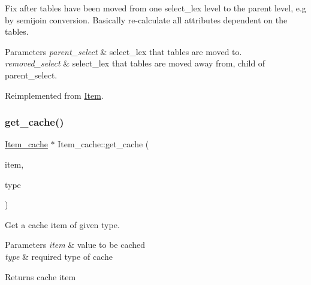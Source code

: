 Fix after tables have been moved from one select\+\_\+lex level to the parent level, e.\+g by semijoin conversion. Basically re-\/calculate all attributes dependent on the tables.


\begin{DoxyParams}{Parameters}
{\em parent\+\_\+select} & select\+\_\+lex that tables are moved to. \\
\hline
{\em removed\+\_\+select} & select\+\_\+lex that tables are moved away from, child of parent\+\_\+select. \\
\hline
\end{DoxyParams}


Reimplemented from \mbox{\hyperlink{classItem_a6e3c38497d210357a4f80a755fb7b61e}{Item}}.

\mbox{\label{classItem__cache_aa6e85d7732bbd77c6beb7ad76c5b21ec}} 
\subsubsection{\texorpdfstring{get\+\_\+cache()}{get\_cache()}}
{\footnotesize\ttfamily \mbox{\hyperlink{classItem__cache}{Item\+\_\+cache}} $\ast$ Item\+\_\+cache\+::get\+\_\+cache (\begin{DoxyParamCaption}\item[{const \mbox{\hyperlink{classItem}{Item}} $\ast$}]{item,  }\item[{const Item\+\_\+result}]{type }\end{DoxyParamCaption})\hspace{0.3cm}{\ttfamily [static]}}

Get a cache item of given type.


\begin{DoxyParams}{Parameters}
{\em item} & value to be cached \\
\hline
{\em type} & required type of cache\\
\hline
\end{DoxyParams}
\begin{DoxyReturn}{Returns}
cache item 
\end{DoxyReturn}
\mbox{\label{classItem__cache_a3015799614afd6cd21ad99c539322923}} 
